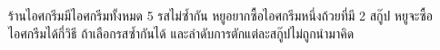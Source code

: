 ﻿%
\question ร้านไอศกรีมมีไอศกรีมทั้งหมด 5 รสไม่ซ้ำกัน หยูอยากซื้อไอศกรีมหนึ่งถ้วยที่มี 2 สกู๊ป หยูจะซื้อไอศกรีมได้กี่วิธี ถ้าเลือกรสซ้ำกันได้ และลำดับการตักแต่ละสกู๊ปไม่ถูกนำมาคิด
\newline
{}
